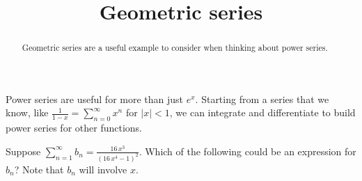 \documentclass{ximera}
\title{Geometric series}
\begin{document}
\begin{abstract}
  Geometric series are a useful example to consider when thinking about power series.
\end{abstract}

\maketitle

Power series are useful for more than just \(e^x\).  Starting from a series that we know, like \(\frac{1}{1-x} = \sum_{n=0}^\infty x^n\) for \(|x| < 1\), we can integrate and differentiate to build power series for other functions.


\begin{question}
  Suppose \(\displaystyle\sum_{n=1}^\infty b_n = \displaystyle\frac{16 \, x^{3} }{ {\left(16 \, x^{4} - 1\right)}^{2} }\).  Which of the following could be an expression for \(b_n\)?  Note that \(b_n\) will involve \(x\).
  

\end{question}
\end{document}
